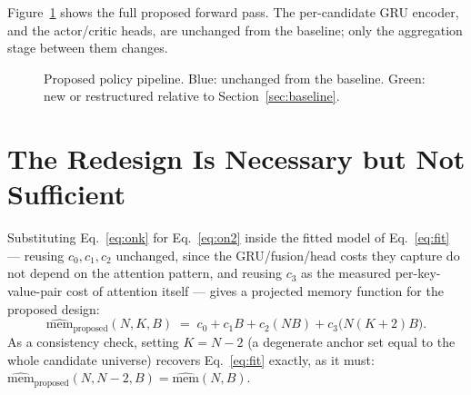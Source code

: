 \documentclass[11pt]{article}
\begin{document}
Figure~\ref{fig:pipeline} shows the full proposed forward pass. The
per-candidate GRU encoder, and the actor/critic heads, are unchanged from
the baseline; only the aggregation stage between them changes.

\begin{figure}[h!]
\centering
{}
\caption{Proposed policy pipeline. Blue: unchanged from the baseline. Green:
new or restructured relative to Section~\ref{sec:baseline}.}
\label{fig:pipeline}
\end{figure}

\section{The Redesign Is Necessary but Not Sufficient}
\label{sec:linear-bottleneck}

Substituting Eq.~\eqref{eq:onk} for Eq.~\eqref{eq:on2} inside the fitted
model of Eq.~\eqref{eq:fit} --- reusing $c_0,c_1,c_2$ unchanged, since the
GRU/fusion/head costs they capture do not depend on the attention pattern,
and reusing $c_3$ as the measured per-key-value-pair cost of attention
itself --- gives a projected memory function for the proposed design:
\begin{equation}
  \widehat{\mathrm{mem}}_{\text{proposed}}(N,K,B) \;=\; c_0 + c_1 B + c_2(NB) + c_3\big(N(K+2)B\big).
  \label{eq:fit-proposed}
\end{equation}
As a consistency check, setting $K = N-2$ (a degenerate anchor set equal to
the whole candidate universe) recovers Eq.~\eqref{eq:fit} exactly, as it
must: $\widehat{\mathrm{mem}}_{\text{proposed}}(N,N{-}2,B) =
\widehat{\mathrm{mem}}(N,B)$.
\end{document}
